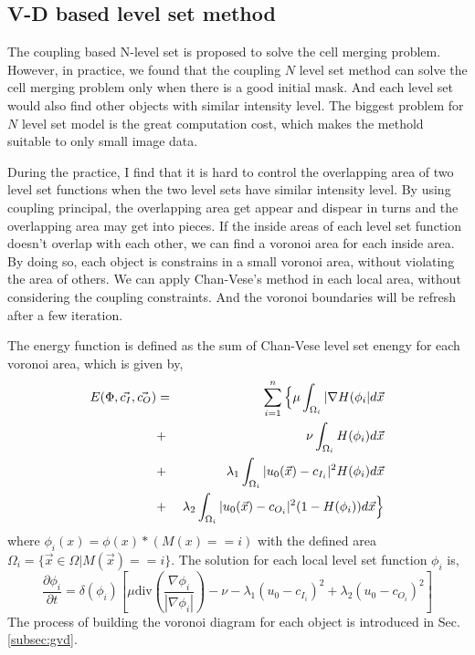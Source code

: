 \subsection{V-D based level set method}
The coupling based N-level set is proposed to solve the cell merging problem. However, in practice, we found that the coupling $N$ level set method can solve the cell merging problem only when there is a good initial mask. And each level set would also find other objects with similar intensity level. The biggest problem for $N$ level set model is the great computation cost, which makes the methold suitable to only small image data.

During the practice, I find that it is hard to control the overlapping area of two level set functions when the two level sets have similar intensity level. By using coupling principal, the overlapping area get appear and dispear in turns and the overlapping area may get into pieces. If the inside areas of each level set function doesn't overlap with each other, we can find a voronoi area for each inside area. By doing so, each object is constrains in a small voronoi area, without violating the area of others. We can apply Chan-Vese's method in each local area, without considering the coupling constraints. And the voronoi boundaries will be refresh after a few iteration.

The energy function is defined as the sum of Chan-Vese level set enengy for each voronoi area, which is given by,
\begin{eqnarray}
\nonumber
E(\Phi,\vec{c_I},\vec{c_O}) & = & \sum_{i=1}^n \Big{\{}\mu \int_{\Omega_i} |\nabla H(\phi_i|d\vec{x} \\
\nonumber
                                                                    & + & \nu\int_{\Omega_i} H(\phi_i)d\vec{x}\\
                                                                    & + & \lambda_1 \int _{\Omega_i}|u_0(\vec{x}) - c_{I_i}|^2H(\phi_i)d\vec{x} \\
\nonumber
                                                                    & + & \lambda_2\int_{\Omega_i}|u_0(\vec{x}) - c_{O_i}|^2(1-H(\phi_i))d\vec{x} \Big{\}}
\end{eqnarray}
where $\phi_i(x) = \phi(x) * (M(x) == i)$ with the defined area $\Omega_i = \{\vec{x} \in \Omega | M(\vec{x}) == i\}$. The solution for each local level set function $\phi_i$ is,
\begin{equation}
\frac{\partial \phi_i}{\partial t} = \delta(\phi_i)\left[\mu\mbox{div}\left(\frac{\nabla\phi_i}{|\nabla\phi_i|}\right)-\nu -\lambda_1(u_0-c_{I_i})^2 + \lambda_2(u_0-c_{O_i})^2\right]
\end{equation}
The process of building the voronoi diagram for each object is introduced in Sec.\ref{subsec:gvd}.

